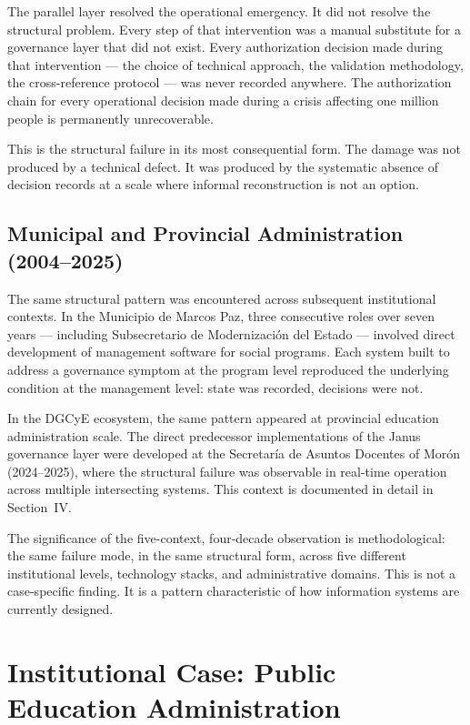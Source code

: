 \documentclass[conference]{IEEEtran}
\begin{document}
The parallel layer resolved the operational emergency. It did not resolve the structural problem. Every step of that intervention was a manual substitute for a governance layer that did not exist. Every authorization decision made during that intervention --- the choice of technical approach, the validation methodology, the cross-reference protocol --- was never recorded anywhere. The authorization chain for every operational decision made during a crisis affecting one million people is permanently unrecoverable.

This is the structural failure in its most consequential form. The damage was not produced by a technical defect. It was produced by the systematic absence of decision records at a scale where informal reconstruction is not an option.

\subsection{Municipal and Provincial Administration (2004--2025)}

The same structural pattern was encountered across subsequent institutional contexts. In the Municipio de Marcos Paz, three consecutive roles over seven years --- including Subsecretario de Modernización del Estado --- involved direct development of management software for social programs. Each system built to address a governance symptom at the program level reproduced the underlying condition at the management level: state was recorded, decisions were not.

In the DGCyE ecosystem, the same pattern appeared at provincial education administration scale. The direct predecessor implementations of the Janus governance layer were developed at the Secretaría de Asuntos Docentes of Morón (2024--2025), where the structural failure was observable in real-time operation across multiple intersecting systems. This context is documented in detail in Section~IV.

The significance of the five-context, four-decade observation is methodological: the same failure mode, in the same structural form, across five different institutional levels, technology stacks, and administrative domains. This is not a case-specific finding. It is a pattern characteristic of how information systems are currently designed.

\section{Institutional Case: Public Education Administration}
\end{document}
